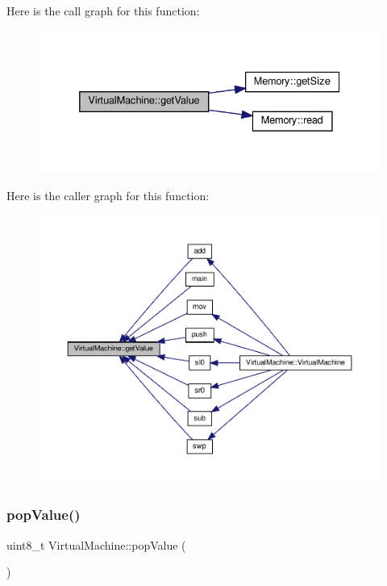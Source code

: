 Here is the call graph for this function\+:
\nopagebreak
\begin{figure}[H]
\begin{center}
\leavevmode
\includegraphics[width=332pt]{class_virtual_machine_a09bdaea77003f19912e0f101faefa26f_cgraph}
\end{center}
\end{figure}
Here is the caller graph for this function\+:
\nopagebreak
\begin{figure}[H]
\begin{center}
\leavevmode
\includegraphics[width=350pt]{class_virtual_machine_a09bdaea77003f19912e0f101faefa26f_icgraph}
\end{center}
\end{figure}
\mbox{\label{class_virtual_machine_a4cbf0a06938ad9b3acb9a1872452e6a5}} 
\subsubsection{\texorpdfstring{pop\+Value()}{popValue()}}
{\footnotesize\ttfamily uint8\+\_\+t Virtual\+Machine\+::pop\+Value (\begin{DoxyParamCaption}{ }\end{DoxyParamCaption})}

